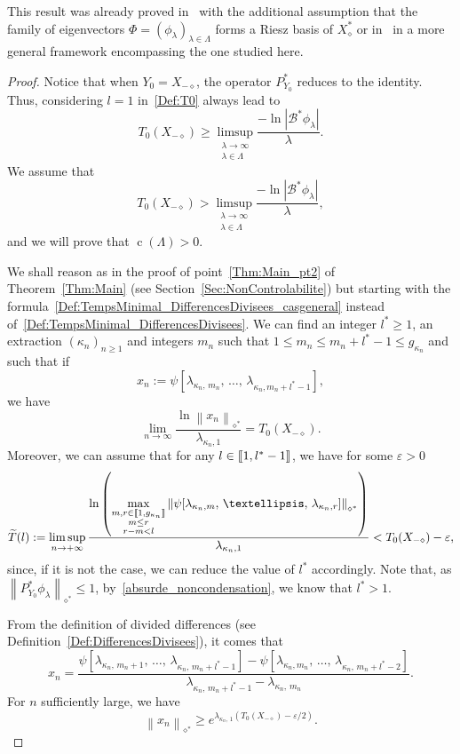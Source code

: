 \documentclass[11pt]{article}
\theoremstyle{definition}
\numberwithin{equation}{section}
\numberwithin{figure}{section}
\numberwithin{table}{section}
\newcommand{\llbracket}{\mathopen{[\mkern -2.7mu[}}
\newcommand{\rrbracket}{\mathclose{]\mkern -2.7mu]}}
\newcommand{\inter}[2]{\llbracket #1,#2 \rrbracket}
\newcommand\Bs{\mathcal{B}^*}
\newcommand{\Xalphas}{X_\diamond^*}
\newcommand{\Xmalpha}{X_{-\diamond}}
\newcommand{\Fzp}{Y_0}
\newcommand{\normeXalphas}[1]{\left\| #1 \right\|_{\diamond^*}}
\newcommand{\PFa}{P_{\Fzp}^*}
\newcommand{\n}{g}
\DeclareMathOperator{\cond}{c}
\begin{document}
This result was already proved in~\cite{AmmarKhodjaBenabdallahGonzalez-BurgosdeTeresa:2014} with the additional assumption that the family of eigenvectors $\Phi=(\phi_\lambda)_{\lambda \in \Lambda}$ forms a Riesz basis of $\Xalphas$ or in~\cite[Remark~1.15]{AKBGBM_2018} in a more general framework encompassing the one studied here.
\begin{proof}
Notice that when $\Fzp = \Xmalpha$, the operator $\PFa$ reduces to the identity. Thus, considering $l=1$ in~\eqref{Def:T0} always lead to
\[
T_{0}(\Xmalpha) \geq \limsup_{\substack{\lambda\to \infty\\ \lambda\in \Lambda}} \frac{-\ln \left| \Bs \phi_\lambda \right|}{\lambda}.
\]
We assume that
\begin{equation}\label{absurde_noncondensation}
T_{0}(\Xmalpha)>\limsup_{\substack{\lambda\to \infty\\ \lambda\in \Lambda}} \frac{-\ln \left| \Bs \phi_\lambda \right|}{\lambda},
\end{equation}
and we will prove that $\cond(\Lambda)>0$.

We shall reason as in the proof of point~\eqref{Thm:Main_pt2} of Theorem~\ref{Thm:Main} (see Section~\ref{Sec:NonControlabilite}) but starting with the formula~\eqref{Def:TempsMinimal_DifferencesDivisees_casgeneral} instead of~\eqref{Def:TempsMinimal_DifferencesDivisees}. We can find an integer $l^*\geq 1$, an extraction $(\kappa_n)_{n \geq 1}$ and integers $m_n$ such that $1\leq m_n\leq m_n+l^*-1\leq \n_{\kappa_n}$ and such that if
\[
x_n := \psi[\lambda_{\kappa_n,\,m_n},\,\dots,\, \lambda_{\kappa_n,m_n+l^*-1}],
\]
we have
\begin{equation*}\label{prop_ynbis}
\lim_{n \to \infty} \frac{\ln \normeXalphas{ x_n }}{\lambda_{\kappa_n,1}} = T_0(\Xmalpha).
\end{equation*}
Moreover, we can assume that for any $l \in \inter{1}{l^*-1}$, we have for some $\varepsilon>0$
\[
\widetilde{T}(l) := \limsup_{n \to + \infty} \frac{\ln \left(\max\limits_{\substack{m,r \in \inter{1}{\n_{\kappa_n}}\\ m\leq r \\ r-m < l} } \normeXalphas{ \psi[\lambda_{\kappa_n,m},\,\dots,\, \lambda_{\kappa_n,r}] } \right)}{\lambda_{\kappa_n,1}} < T_0(\Xmalpha)-\varepsilon,
\]
since, if it is not the case, we can reduce the value of $l^*$ accordingly. Note that, as $\normeXalphas{ \PFa \phi_\lambda } \leq 1$, by~\eqref{absurde_noncondensation}, we know that $l^*>1$.

From the definition of divided differences (see Definition~\ref{Def:DifferencesDivisees}), it comes that
\[
x_n = \frac{\psi[\lambda_{\kappa_n,\,m_n+1},\,\dots,\,\lambda_{\kappa_n,\,m_n+l^*-1}]-\psi[\lambda_{\kappa_n,m_n},\,\dots,\,\lambda_{\kappa_n,\,m_n+l^*-2}]}{\lambda_{\kappa_n,\,m_n+l^*-1}-\lambda_{\kappa_n,\,m_n}}.
\]
For $n$ sufficiently large, we have
\[
\normeXalphas{ x_n } \geq e^{\lambda_{\kappa_n,\,1} (T_0(\Xmalpha)-\varepsilon/2)}.
\]


\end{proof}
\end{document}
